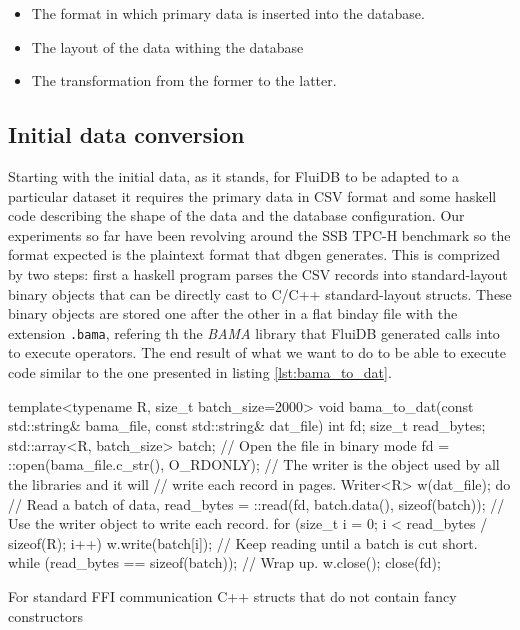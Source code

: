 \begin{itemize}
\item The format in which primary data is inserted into the database.
\item The layout of the data withing the database
\item The transformation from the former to the latter.
\end{itemize}

\subsection{Initial data conversion}

Starting with the initial data, as it stands, for FluiDB to be adapted
to a particular dataset it requires the primary data in CSV format and
some haskell code describing the shape of the data and the database
configuration. Our experiments so far have been revolving around the
SSB TPC-H benchmark so the format expected is the plaintext format
that dbgen \cite{perivolaropoulosFakedrakeSsbdbgen2021} generates. This
is comprized by two steps: first a haskell program parses the CSV
records into standard-layout binary objects that can be directly cast
to C/C++ standard-layout structs. These binary objects are stored one
after the other in a flat binday file with the extension \texttt{.bama},
refering th the \emph{BAMA} library that FluiDB generated calls into to
execute operators. The end result of what we want to do to be able to
execute code similar to the one presented in listing
\ref{lst:bama_to_dat}.

\begin{code}
\begin{cppcode}
template<typename R, size_t batch_size=2000>
void bama_to_dat(const std::string& bama_file, const std::string& dat_file) {
  int fd;
  size_t read_bytes;
  std::array<R, batch_size> batch;
  // Open the file in binary mode
  fd = ::open(bama_file.c_str(), O_RDONLY);
  // The writer is the object used by all the libraries and it will
  // write each record in pages.
  Writer<R> w(dat_file);
  do {
    // Read a batch of data,
    read_bytes = ::read(fd, batch.data(), sizeof(batch));
    // Use the writer object to write each record.
    for (size_t i = 0; i < read_bytes / sizeof(R); i++) {
      w.write(batch[i]);
    }
    // Keep reading until a batch is cut short.
  } while (read_bytes == sizeof(batch));
  // Wrap up.
  w.close();
  close(fd);
}
\end{cppcode}
  \caption{\label{lst:bama_to_dat}For standard FFI communication C++
    structs that do not contain fancy constructors}
\end{code}

